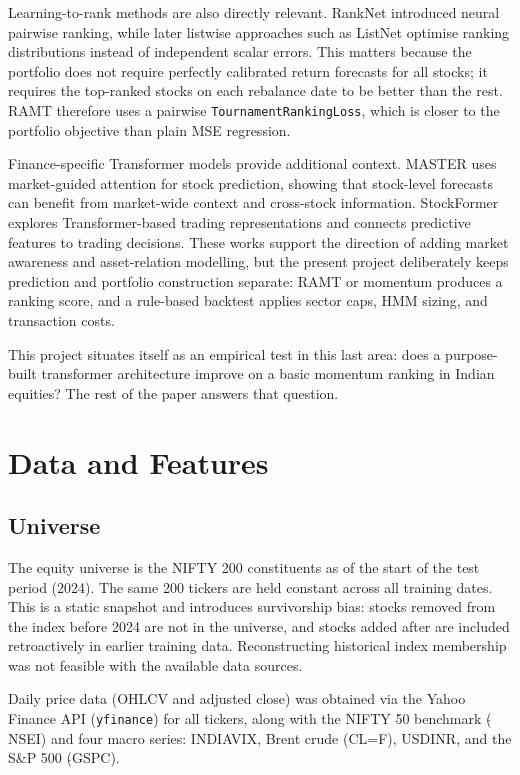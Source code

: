 \documentclass[conference]{IEEEtran}
\begin{document}
Learning-to-rank methods are also directly relevant. RankNet \cite{burges2005ranknet} introduced neural pairwise ranking, while later listwise approaches such as ListNet \cite{cao2007listnet} optimise ranking distributions instead of independent scalar errors. This matters because the portfolio does not require perfectly calibrated return forecasts for all stocks; it requires the top-ranked stocks on each rebalance date to be better than the rest. RAMT therefore uses a pairwise \texttt{TournamentRankingLoss}, which is closer to the portfolio objective than plain MSE regression.

Finance-specific Transformer models provide additional context. MASTER \cite{li2024master} uses market-guided attention for stock prediction, showing that stock-level forecasts can benefit from market-wide context and cross-stock information. StockFormer \cite{gao2023stockformer} explores Transformer-based trading representations and connects predictive features to trading decisions. These works support the direction of adding market awareness and asset-relation modelling, but the present project deliberately keeps prediction and portfolio construction separate: RAMT or momentum produces a ranking score, and a rule-based backtest applies sector caps, HMM sizing, and transaction costs.

This project situates itself as an empirical test in this last area: does a purpose-built transformer architecture improve on a basic momentum ranking in Indian equities? The rest of the paper answers that question.

\section{Data and Features}

\subsection{Universe}

The equity universe is the NIFTY 200 constituents as of the start of the test period (2024). The same 200 tickers are held constant across all training dates. This is a static snapshot and introduces survivorship bias: stocks removed from the index before 2024 are not in the universe, and stocks added after are included retroactively in earlier training data. Reconstructing historical index membership was not feasible with the available data sources.

Daily price data (OHLCV and adjusted close) was obtained via the Yahoo Finance API (\texttt{yfinance}) for all tickers, along with the NIFTY 50 benchmark ($\hat{}$NSEI) and four macro series: INDIAVIX, Brent crude (CL=F), USDINR, and the S\&P 500 ($\hat{}$GSPC).
\end{document}
